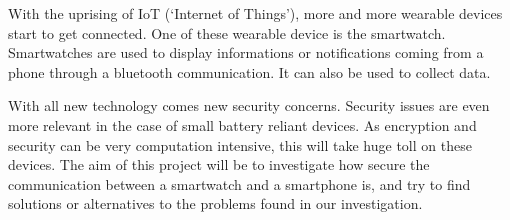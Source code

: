 With the uprising of IoT (‘Internet of Things’), more and more wearable devices start to get connected. One of these wearable device is the smartwatch. Smartwatches are used to display informations or notifications coming from a phone through a bluetooth communication. It can also be used to collect data.

With all new technology comes new security concerns. Security issues are even more relevant in the case of small battery reliant devices. As encryption and security can be very computation intensive, this will take huge toll on these devices. The aim of this project will be to investigate how secure the communication between a smartwatch and a smartphone is, and try to find solutions or alternatives to the problems found in our investigation.